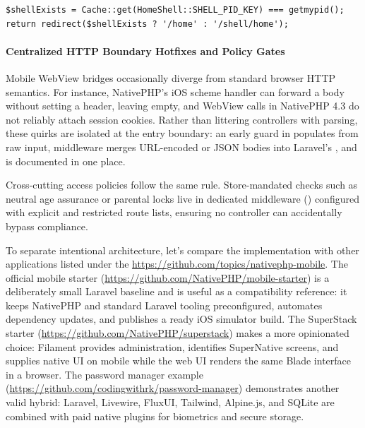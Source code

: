 \begin{lstlisting}[language=php8]
$shellExists = Cache::get(HomeShell::SHELL_PID_KEY) === getmypid();
return redirect($shellExists ? '/home' : '/shell/home');
\end{lstlisting}

\paragraph{Centralized HTTP Boundary Hotfixes and Policy Gates}
Mobile WebView bridges occasionally diverge from standard browser HTTP semantics. For instance,
NativePHP's iOS scheme handler can forward a  body without setting a 
header, leaving  empty, and WebView  calls in NativePHP 4.3 do not
reliably attach session cookies. Rather than littering controllers with  parsing,
these quirks are isolated at the entry boundary: an early guard in 
populates  from raw input,  middleware merges URL-encoded or
JSON bodies into Laravel's , and  is documented
in one place.

Cross-cutting access policies follow the same rule. Store-mandated checks such as neutral age
assurance or parental locks live in dedicated middleware () configured with
explicit  and restricted route lists, ensuring no controller can accidentally bypass
compliance.

To separate intentional architecture, let's compare the implementation
with other applications listed under the
\href{https://github.com/topics/nativephp-mobile}{https://github.com/topics/nativephp-mobile}.
The official mobile starter
(\href{https://github.com/NativePHP/mobile-starter}{https://github.com/NativePHP/mobile-starter})
is a deliberately small Laravel baseline and is useful as a compatibility reference: it keeps
NativePHP and standard Laravel tooling preconfigured, automates dependency updates, and
publishes a ready iOS simulator build. The SuperStack starter
(\href{https://github.com/NativePHP/superstack}{https://github.com/NativePHP/superstack})
makes a more opinionated choice: Filament provides administration, 
identifies SuperNative screens, and  supplies native UI on mobile while
the web UI renders the same Blade interface in a browser. The password manager example
(\href{https://github.com/codingwithrk/password-manager}{https://github.com/codingwithrk/password-manager})
demonstrates another valid hybrid: Laravel, Livewire, FluxUI, Tailwind, Alpine.js, and SQLite
are combined with paid native plugins for biometrics and secure storage.

